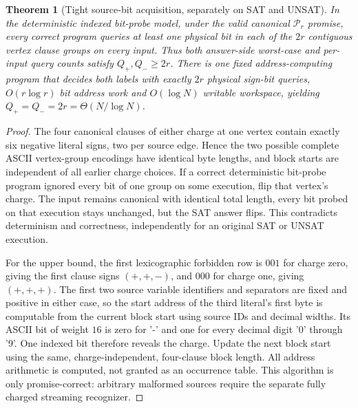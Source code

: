 \documentclass[11pt]{article}
\newtheorem{theorem}{Theorem}
\begin{document}
\begin{theorem}[Tight source-bit acquisition, separately on SAT and UNSAT]
In the deterministic indexed bit-probe model, under the valid canonical $\mathcal P_r$ promise, every correct program queries at least one physical bit in each of the $2r$ contiguous vertex clause groups on every input. Thus both answer-side worst-case and per-input query counts satisfy $Q_+,Q_-\ge 2r$. There is one fixed address-computing program that decides both labels with exactly $2r$ physical sign-bit queries, $O(r\log r)$ bit address work and $O(\log N)$ writable workspace, yielding $Q_+=Q_-=2r=\Theta(N/\log N)$.
\end{theorem}
\begin{proof}
The four canonical clauses of either charge at one vertex contain exactly six negative literal signs, two per source edge. Hence the two possible complete ASCII vertex-group encodings have identical byte lengths, and block starts are independent of all earlier charge choices. If a correct deterministic bit-probe program ignored every bit of one group on some execution, flip that vertex's charge. The input remains canonical with identical total length, every bit probed on that execution stays unchanged, but the SAT answer flips. This contradicts determinism and correctness, independently for an original SAT or UNSAT execution.

For the upper bound, the first lexicographic forbidden row is $001$ for charge zero, giving the first clause signs $(+,+,-)$, and $000$ for charge one, giving $(+,+,+)$. The first two source variable identifiers and separators are fixed and positive in either case, so the start address of the third literal's first byte is computable from the current block start using source IDs and decimal widths. Its ASCII bit of weight $16$ is zero for '-' and one for every decimal digit '0' through '9'. One indexed bit therefore reveals the charge. Update the next block start using the same, charge-independent, four-clause block length. All address arithmetic is computed, not granted as an occurrence table. This algorithm is only promise-correct: arbitrary malformed sources require the separate fully charged streaming recognizer.
\end{proof}
\end{document}
